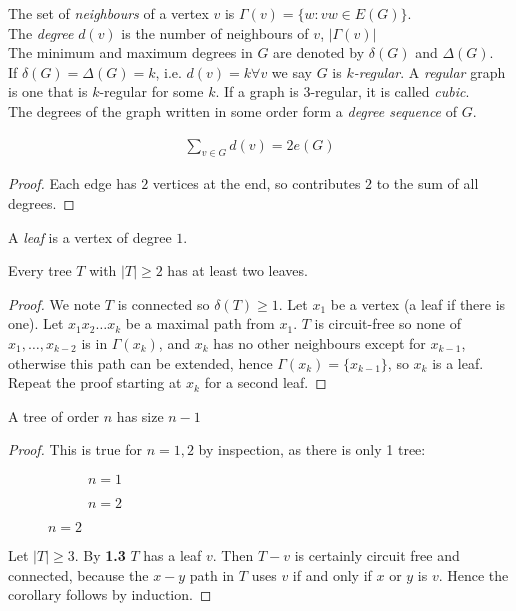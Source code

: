 \documentclass[10pt,a4paper]{article}
\begin{document}
The set of \emph{neighbours} of a vertex $v$ is $\Gamma(v) = \{w: vw\in E(G)\}$.\\
The \emph{degree} $d(v)$ is the number of neighbours of $v$, $|\Gamma(v)|$\\
The minimum and maximum degrees in $G$ are denoted by $\delta(G)$ and $\Delta(G)$. \\
If $\delta(G) = \Delta(G) = k$, i.e. $d(v)=k \forall v$ we say $G$ is \emph{$k$-regular}. A \emph{regular} graph is one that is $k$-regular for some $k$. If a graph is $3$-regular, it is called \emph{cubic}.\\
The degrees of the graph written in some order form a \emph{degree sequence} of $G$.

\begin{lemma}
\begin{align*}
\sum_{v\in G} d(v) = 2e(G)
\end{align*}
\end{lemma}
\begin{proof}
Each edge has $2$ vertices at the end, so contributes $2$ to the sum of all degrees.
\end{proof}
A \emph{leaf} is a vertex of degree $1$.
\begin{theorem}
Every tree $T$ with $|T|\geq 2$ has at least two leaves.
\end{theorem}
\begin{proof}
We note $T$ is connected so $\delta(T) \geq 1$. Let $x_1$ be a vertex (a leaf if there is one). Let $x_1x_2\ldots x_k$ be a maximal path from $x_1$. $T$ is circuit-free so none of $x_1,\ldots,x_{k-2}$ is in $\Gamma(x_k)$, and $x_k$ has no other neighbours except for $x_{k-1}$, otherwise this path can be extended, hence $\Gamma(x_k) = \{x_{k-1}\}$, so $x_k$ is a leaf. Repeat the proof starting at $x_k$ for a second leaf.
\end{proof}

\begin{corollary}
A tree of order $n$ has size $n-1$
\end{corollary}
\begin{proof}
\item
This is true for $n = 1, 2$ by inspection, as there is only 1 tree:

\begin{figure}[h]
\begin{subfigure}{.5\textwidth}
\centering
{}
\caption{$n=1$}
\end{subfigure}
\begin{subfigure}{.5\textwidth}
\centering
{}
\caption{$n=2$}
\end{subfigure}
\end{figure}
Let $|T| \geq 3$. By \textbf{1.3} $T$ has a leaf $v$. Then $T-v$ is certainly circuit free and connected, because the $x-y$ path in $T$ uses $v$ if and only if $x$ or $y$ is $v$. Hence the corollary follows by induction.
\end{proof}
\end{document}
